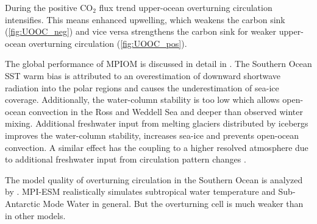 
During the positive CO$_2$ flux trend upper-ocean overturning circulation intensifies. This means enhanced upwelling, which weakens the carbon sink (\autoref{fig:UOOC_neg}) and vice versa strengthens the carbon sink for weaker upper-ocean overturning circulation (\autoref{fig:UOOC_pos}). %



The global performance of \acs{MPIOM} is discussed in detail in \cite{Jungclaus2013}. The Southern Ocean \acs{SST} warm bias is attributed to an overestimation of downward shortwave radiation into the polar regions \citep{Stevens2013} and causes the underestimation of sea-ice coverage. Additionally, the water-column stability is too low which allows open-ocean convection in the Ross and Weddell Sea and deeper than observed winter mixing. %
Additional freshwater input from melting glaciers distributed by icebergs improves the water-column stability, increases sea-ice and prevents open-ocean convection. A similar effect has the coupling to a higher resolved atmosphere due to additional freshwater input from circulation pattern changes \citep{Stoessel2015}. 

The model quality of overturning circulation in the Southern Ocean is analyzed by \cite{Sallee2013a}. \acs{MPI-ESM} realistically simulates subtropical water temperature and Sub-Antarctic Mode Water in general. But the overturning cell is much weaker than in other models.

